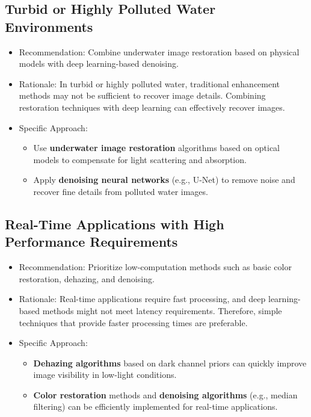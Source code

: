 \documentclass[withoutpreface,bwprint]{cumcmthesis}
\begin{document}
\subsection{Turbid or Highly Polluted Water Environments}

\begin{itemize}
    \item Recommendation: Combine underwater image restoration based on physical models with deep learning-based denoising.

    \item Rationale: In turbid or highly polluted water, traditional enhancement methods may not be sufficient to recover image details. Combining restoration techniques with deep learning can effectively recover images.

    \item Specific Approach:
        \begin{itemize}
            \item Use \textbf{underwater image restoration} algorithms based on optical models to compensate for light scattering and absorption.

            \item Apply \textbf{denoising neural networks} (e.g., U-Net) to remove noise and recover fine details from polluted water images.
        \end{itemize}
\end{itemize}

\subsection{Real-Time Applications with High Performance Requirements}

\begin{itemize}
    \item Recommendation: Prioritize low-computation methods such as basic color restoration, dehazing, and denoising.

    \item Rationale: Real-time applications require fast processing, and deep learning-based methods might not meet latency requirements. Therefore, simple techniques that provide faster processing times are preferable.

    \item Specific Approach:
        \begin{itemize}
            \item \textbf{Dehazing algorithms} based on dark channel priors can quickly improve image visibility in low-light conditions.

            \item \textbf{Color restoration} methods and \textbf{denoising algorithms} (e.g., median filtering) can be efficiently implemented for real-time applications.
        \end{itemize}
\end{itemize}
\end{document}

